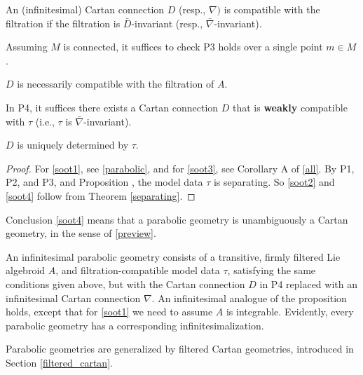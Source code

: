 \documentclass[leqno,12pt]{amsart} %
\begin{document}
An (infinitesimal) Cartan connection $D$ (resp., $\nabla)$ is {\df compatible} with
the filtration if the filtration is $\bar D$-invariant (resp., $\bar\nabla$-invariant).
\begin{proposition}%
  \mbox{}
  \begin{conditions}
  \item Assuming $M$ is connected, it suffices to check P3 holds over
    a single point $m \in M$.\label{soot1}
  \item $D$ is necessarily compatible with the filtration of $A$.\label{soot3}
  \item In P4, it suffices there exists a Cartan connection $D$ that is {\bfseries weakly}
    compatible with $\tau$ (i.e., $\tau $ is $\bar\nabla $-invariant).\label{soot2}
  \item $D$ is uniquely determined by $\tau$. \label{soot4}
  \end{conditions}
\end{proposition}
\begin{proof}
  For \eqref{soot1}, see \ref{parabolic}, and for \eqref{soot3}, see Corollary A of
  \ref{all}. By P1, P2, and P3, and Proposition ,
  the model data $\tau $ is separating. So \eqref{soot2} and \eqref{soot4} follow from
  Theorem \ref{separating}.
\end{proof}

Conclusion \eqref{soot4} means that a parabolic geometry is unambiguously a Cartan
geometry, in the sense of \ref{preview}.

An {\df infinitesimal parabolic geometry} consists of a transitive, firmly filtered Lie
algebroid $A$, and filtration-compatible model data $\tau $, satisfying the same
conditions given above, but with the Cartan connection $D$ in P4 replaced with an
infinitesimal Cartan connection $\nabla$. An infinitesimal analogue of the proposition
holds, except that for \eqref{soot1} we need to assume $A$ is integrable. Evidently, every
parabolic geometry has a corresponding infinitesimalization.



Parabolic geometries are generalized by {\df filtered Cartan geometries}, introduced in
Section \ref{filtered_cartan}.
\end{document}

